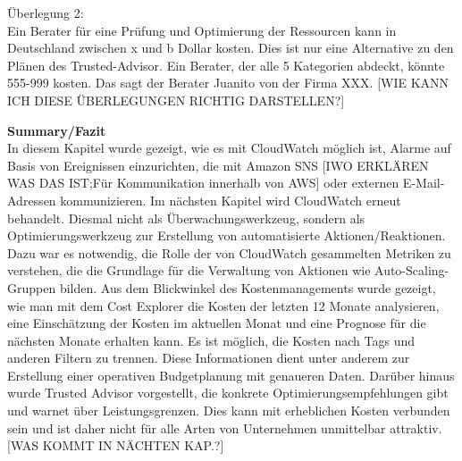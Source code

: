Überlegung 2: \\ 
Ein Berater für eine Prüfung und Optimierung der Ressourcen kann in Deutschland zwischen x und b Dollar kosten. Dies ist nur eine Alternative zu den Plänen des Trusted-Advisor. Ein Berater, der alle 5 Kategorien abdeckt, könnte 555-999 kosten. Das sagt der Berater Juanito von der Firma XXX.
[WIE KANN ICH DIESE ÜBERLEGUNGEN RICHTIG DARSTELLEN?]




\textbf{Summary/Fazit}\\
In diesem Kapitel wurde gezeigt, wie es mit CloudWatch möglich ist, Alarme auf Basis von Ereignissen einzurichten, die mit Amazon SNS [IWO ERKLÄREN WAS DAS IST;Für Kommunikation innerhalb von AWS] oder externen E-Mail-Adressen kommunizieren. Im nächsten Kapitel wird CloudWatch erneut behandelt. Diesmal nicht als Überwachungswerkzeug, sondern als Optimierungswerkzeug zur Erstellung von automatisierte Aktionen/Reaktionen. Dazu war es notwendig, die Rolle der von CloudWatch gesammelten Metriken zu verstehen, die die Grundlage für die Verwaltung von Aktionen wie Auto-Scaling-Gruppen bilden. 
Aus dem Blickwinkel des Kostenmanagements wurde gezeigt, wie man mit dem Cost Explorer die Kosten der letzten 12 Monate analysieren, eine Einschätzung der Kosten im aktuellen Monat und eine Prognose für die nächsten Monate erhalten kann. Es ist möglich, die Kosten nach Tags und anderen Filtern zu trennen. Diese Informationen dient unter anderem zur Erstellung einer operativen Budgetplanung mit genaueren Daten.
Darüber hinaus wurde Trusted Advisor vorgestellt, die konkrete Optimierungsempfehlungen gibt und warnet über Leistungsgrenzen. Dies kann mit erheblichen Kosten verbunden sein und ist daher nicht für alle Arten von Unternehmen unmittelbar attraktiv. 
[WAS KOMMT IN NÄCHTEN KAP.?]

